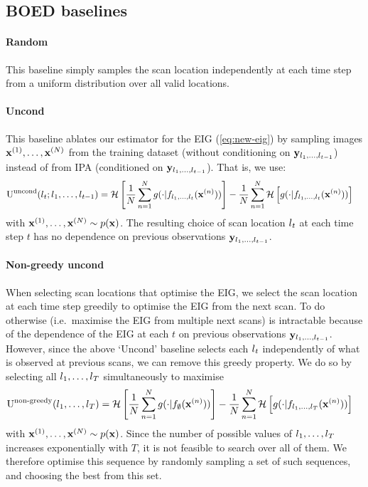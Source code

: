 \subsection{BOED baselines}
\paragraph{Random}
This baseline simply samples the scan location independently at each time step
from a uniform distribution over all valid locations.

\paragraph{Uncond}
This baseline ablates our estimator for the EIG (\cref{eq:new-eig}) by sampling
images ${\mathbf{x}}^{(1)},\ldots,{\mathbf{x}}^{(N)}$ from the training dataset (without
conditioning on ${\mathbf{y}}_{l{}_1,\ldots,l{}_{t-1}}$) instead of from IPA
(conditioned on ${\mathbf{y}}_{l{}_1,\ldots,l{}_{t-1}}$). That is, we use:
\begin{align}
  \label{eq:uncond}
  \text{U}^{\text{uncond}}(l{}_t; l{}_1,&\ldots,l{}_{t-1}) = \mathcal{H} \left[ \frac{1}{N} \sum_{n=1}^N g(\cdot|f_{l{}_1,\ldots,l{}_t}({\mathbf{x}}^{(n)})) \right] - \frac{1}{N} \sum_{n=1}^N  \mathcal{H} \left[ g(\cdot|f_{l{}_1,\ldots,l{}_t}({\mathbf{x}}^{(n)})) \right]
\end{align}
with ${\mathbf{x}}^{(1)},\ldots,{\mathbf{x}}^{(N)} \sim p({\mathbf{x}})$. The resulting choice of scan
location $l{}_t$ at each time step $t$ has no dependence on previous
observations ${\mathbf{y}}_{l{}_1,\ldots,l{}_{t-1}}$.

\paragraph{Non-greedy uncond}
When selecting scan locations that optimise the EIG, we select the scan location
at each time step greedily to optimise the EIG from the next scan. To do
otherwise (i.e.~maximise the EIG from multiple next scans) is intractable
because of the dependence of the EIG at each $t$ on previous observations
${\mathbf{y}}_{l{}_1,\ldots,l{}_{t-1}}$. However, since the above `Uncond' baseline
selects each $l{}_t$ independently of what is observed at previous scans, we can
remove this greedy property. We do so by selecting all $l{}_1,\ldots,l{}_T$
simultaneously to maximise
\begin{align}
  \text{U}^{\text{non-greedy}}(l{}_1,&\ldots,l{}_T) = \mathcal{H} \left[ \frac{1}{N} \sum_{n=1}^N g(\cdot|f_{\emptyset}({\mathbf{x}}^{(n)})) \right] - \frac{1}{N} \sum_{n=1}^N  \mathcal{H} \left[ g(\cdot|f_{l{}_1,\ldots,l{}_T}({\mathbf{x}}^{(n)})) \right]
\end{align}
with ${\mathbf{x}}^{(1)},\ldots,{\mathbf{x}}^{(N)} \sim p({\mathbf{x}})$. Since the number of possible
values of $l{}_1,\ldots,l{}_T$ increases exponentially with $T$, it is not feasible
to search over all of them. We therefore optimise this sequence by
randomly sampling a set of such sequences, and choosing the best from this set.


